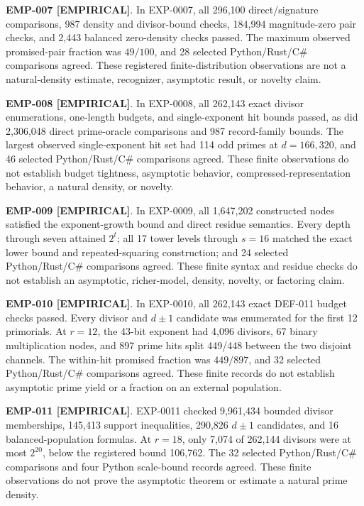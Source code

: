 \documentclass[11pt]{article}
\newcommand{\claimstatus}[2]{\textbf{#1 [#2]}}
\begin{document}
\claimstatus{EMP-007}{EMPIRICAL}. In EXP-0007, all 296,100 direct/signature
comparisons, 987 density and divisor-bound checks, 184,994 magnitude-zero pair
checks, and 2,443 balanced zero-density checks passed. The maximum observed
promised-pair fraction was \(49/100\), and 28 selected Python/Rust/C\#
comparisons agreed. These registered finite-distribution observations are not
a natural-density estimate, recognizer, asymptotic result, or novelty claim.

\claimstatus{EMP-008}{EMPIRICAL}. In EXP-0008, all 262,143 exact divisor
enumerations, one-length budgets, and single-exponent hit bounds passed, as
did 2,306,048 direct prime-oracle comparisons and 987 record-family bounds.
The largest observed single-exponent hit set had 114 odd primes at
\(d=166{,}320\), and 46 selected Python/Rust/C\# comparisons agreed. These
finite observations do not establish budget tightness, asymptotic behavior,
compressed-representation behavior, a natural density, or novelty.

\claimstatus{EMP-009}{EMPIRICAL}. In EXP-0009, all 1,647,202 constructed
nodes satisfied the exponent-growth bound and direct residue semantics.
Every depth through seven attained \(2^t\); all 17 tower levels through
\(s=16\) matched the exact lower bound and repeated-squaring construction;
and 24 selected Python/Rust/C\# comparisons agreed. These finite syntax and
residue checks do not establish an asymptotic, richer-model, density, novelty,
or factoring claim.

\claimstatus{EMP-010}{EMPIRICAL}. In EXP-0010, all 262,143 exact DEF-011
budget checks passed. Every divisor and \(d\pm1\) candidate was enumerated for
the first 12 primorials. At \(r=12\), the 43-bit exponent had 4,096 divisors,
67 binary multiplication nodes, and 897 prime hits split 449/448 between the
two disjoint channels. The within-hit promised fraction was \(449/897\), and
32 selected Python/Rust/C\# comparisons agreed. These finite records do not
establish asymptotic prime yield or a fraction on an external population.

\claimstatus{EMP-011}{EMPIRICAL}. EXP-0011 checked 9,961,434 bounded divisor
memberships, 145,413 support inequalities, 290,826 \(d\pm1\) candidates, and
16 balanced-population formulas. At \(r=18\), only 7,074 of 262,144 divisors
were at most \(2^{20}\), below the registered bound 106,762. The 32 selected
Python/Rust/C\# comparisons and four Python scale-bound records agreed. These
finite observations do not
prove the asymptotic theorem or estimate a natural prime density.
\end{document}
